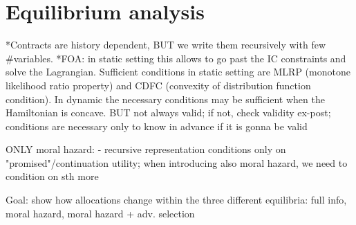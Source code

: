 \section{Equilibrium analysis}

*Contracts are history dependent, BUT we write them recursively with few \#variables.
*FOA: in static setting this allows to go past the IC constraints and solve the Lagrangian. Sufficient conditions in static setting are MLRP (monotone likelihood ratio property) and CDFC (convexity of distribution function condition). In dynamic the necessary conditions may be sufficient when the Hamiltonian is concave.
    BUT not always valid; if not, check validity ex-post; conditions are necessary only to know in advance if it is gonna be valid




ONLY moral hazard:
- recursive representation conditions only on "promised"/continuation utility; when introducing also moral hazard, we need to condition on sth more






Goal: show how allocations change within the three different equilibria: full info, moral hazard, moral hazard + adv. selection 



